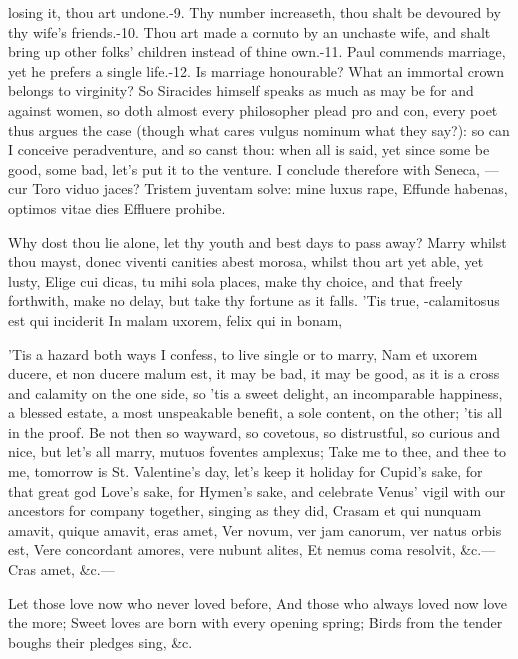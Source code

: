 {losing it, thou art undone.-9. Thy number increaseth, thou shalt be
devoured by thy wife's friends.-10. Thou art made a cornuto by an
unchaste wife, and shalt bring up other folks' children instead of
thine own.-11. Paul commends marriage, yet he prefers a single
life.-12. Is marriage honourable? What an immortal crown belongs to
virginity?
So Siracides himself speaks as much as may be for and against women, so
doth almost every philosopher plead pro and con, every poet thus argues
the case (though what cares vulgus nominum what they say?): so can I
conceive peradventure, and so canst thou: when all is said, yet since
some be good, some bad, let's put it to the venture. I conclude
therefore with Seneca,
---cur Toro viduo jaces?
Tristem juventam solve: mine luxus rape,
Effunde habenas, optimos vitae dies
Effluere prohibe.

Why dost thou lie alone, let thy youth and best days to pass away?
Marry whilst thou mayst, donec viventi canities abest morosa, whilst
thou art yet able, yet lusty, Elige cui dicas, tu mihi sola
places, make thy choice, and that freely forthwith, make no delay, but
take thy fortune as it falls. 'Tis true,
-calamitosus est qui inciderit
In malam uxorem, felix qui in bonam,

'Tis a hazard both ways I confess, to live single or to marry,
Nam et uxorem ducere, et non ducere malum est, it may be bad, it
may be good, as it is a cross and calamity on the one side, so 'tis a
sweet delight, an incomparable happiness, a blessed estate, a most
unspeakable benefit, a sole content, on the other; 'tis all in the
proof. Be not then so wayward, so covetous, so distrustful, so curious
and nice, but let's all marry, mutuos foventes amplexus; Take me to
thee, and thee to me, tomorrow is St. Valentine's day, let's keep it
holiday for Cupid's sake, for that great god Love's sake, for Hymen's
sake, and celebrate Venus' vigil with our ancestors for company
together, singing as they did,
Crasam et qui nunquam amavit, quique amavit, eras amet,
Ver novum, ver jam canorum, ver natus orbis est,
Vere concordant amores, vere nubunt alites,
Et nemus coma resolvit, \&c.---
Cras amet, \&c.---

Let those love now who never loved before,
And those who always loved now love the more;
Sweet loves are born with every opening spring;
Birds from the tender boughs their pledges sing, \&c.

}
